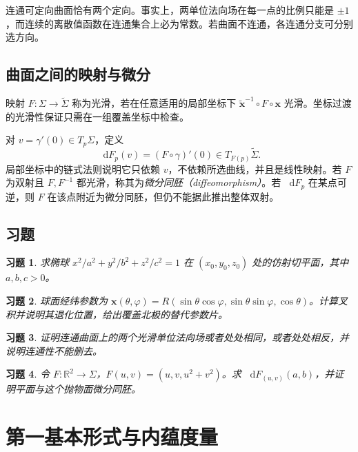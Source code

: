 \documentclass[UTF8,12pt,a4paper,fontset=fandol]{ctexbook}
\newcommand{\R}{\mathbb R}
\newcommand{\dd}{\mathop{}\!\mathrm d}
\newtheorem{exercise}{习题}[chapter]
\begin{document}
连通可定向曲面恰有两个定向。事实上，两单位法向场在每一点的比例只能是 $\pm1$，而连续的离散值函数在连通集合上必为常数。若曲面不连通，各连通分支可分别选方向。

\section{曲面之间的映射与微分}
映射 $F:\Sigma\to\widetilde\Sigma$ 称为光滑，若在任意适用的局部坐标下 $\widetilde{\mathbf x}^{-1}\circ F\circ\mathbf x$ 光滑。坐标过渡的光滑性保证只需在一组覆盖坐标中检查。

对 $v=\gamma'(0)\in T_p\Sigma$，定义
\[
 \dd F_p(v)=(F\circ\gamma)'(0)\in T_{F(p)}\widetilde\Sigma.
\]
局部坐标中的链式法则说明它只依赖 $v$，不依赖所选曲线，并且是线性映射。若 $F$ 为双射且 $F,F^{-1}$ 都光滑，称其为\emph{微分同胚（diffeomorphism）}。若 $\dd F_p$ 在某点可逆，则 $F$ 在该点附近为微分同胚，但仍不能据此推出整体双射。

\section{习题}
\begin{exercise}\label{ex:dg-surfaces-tangent}
求椭球 $x^2/a^2+y^2/b^2+z^2/c^2=1$ 在 $(x_0,y_0,z_0)$ 处的仿射切平面，其中 $a,b,c>0$。
\end{exercise}
\begin{exercise}\label{ex:dg-surfaces-chart}
球面经纬参数为 $\mathbf x(\theta,\varphi)=R(\sin\theta\cos\varphi,\sin\theta\sin\varphi,\cos\theta)$。计算叉积并说明其退化位置，给出覆盖北极的替代参数片。
\end{exercise}
\begin{exercise}\label{ex:dg-surfaces-orientation}
证明连通曲面上的两个光滑单位法向场或者处处相同，或者处处相反，并说明连通性不能删去。
\end{exercise}
\begin{exercise}\label{ex:dg-surfaces-differential}
令 $F:\R^2\to\Sigma$，$F(u,v)=(u,v,u^2+v^2)$。求 $\dd F_{(u,v)}(a,b)$，并证明平面与这个抛物面微分同胚。
\end{exercise}

\chapter{第一基本形式与内蕴度量}
\label{chap:dg-metric}
\end{document}
